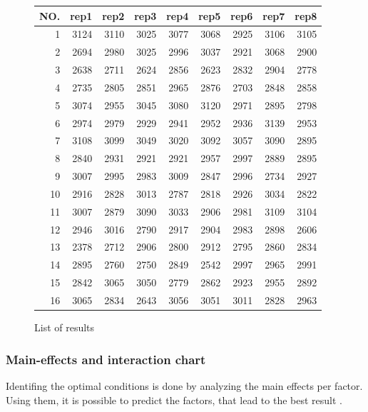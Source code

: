 \begin{figure}[H]
	\centering
	\begin{tabular}{ rrrrrrrrr }
		\hline
		NO.& rep1 & rep2 & rep3 & rep4 & rep5 & rep6 & rep7 & rep8\\
		\hline
		1 & 3124 & 3110 & 3025 & 3077 & 3068 & 2925 & 3106 & 3105 \\ 
		2 & 2694 & 2980 & 3025 & 2996 & 3037 & 2921 & 3068 & 2900 \\ 
		3 & 2638 & 2711 & 2624 & 2856 & 2623 & 2832 & 2904 & 2778 \\ 
		4 & 2735 & 2805 & 2851 & 2965 & 2876 & 2703 & 2848 & 2858 \\ 
		5 & 3074 & 2955 & 3045 & 3080 & 3120 & 2971 & 2895 & 2798 \\ 
		6 & 2974 & 2979 & 2929 & 2941 & 2952 & 2936 & 3139 & 2953 \\ 
		7 & 3108 & 3099 & 3049 & 3020 & 3092 & 3057 & 3090 & 2895 \\ 
		8 & 2840 & 2931 & 2921 & 2921 & 2957 & 2997 & 2889 & 2895 \\ 
		9 & 3007 & 2995 & 2983 & 3009 & 2847 & 2996 & 2734 & 2927 \\ 
		10 & 2916 & 2828 & 3013 & 2787 & 2818 & 2926 & 3034 & 2822 \\ 
		11 & 3007 & 2879 & 3090 & 3033 & 2906 & 2981 & 3109 & 3104 \\ 
		12 & 2946 & 3016 & 2790 & 2917 & 2904 & 2983 & 2898 & 2606 \\ 
		13 & 2378 & 2712 & 2906 & 2800 & 2912 & 2795 & 2860 & 2834 \\ 
		14 & 2895 & 2760 & 2750 & 2849 & 2542 & 2997 & 2965 & 2991 \\ 
		15 & 2842 & 3065 & 3050 & 2779 & 2862 & 2923 & 2955 & 2892 \\ 
		16 & 3065 & 2834 & 2643 & 3056 & 3051 & 3011 & 2828 & 2963 \\ 
		\hline
	\end{tabular}
	\caption{List of results}
\end{figure}



\subsubsection{Main-effects and interaction chart}
Identifing the optimal conditions is done by analyzing the main effects per factor. Using them, it is possible to predict the factors, that lead to the best result \cite{roy_primer_1990}.


